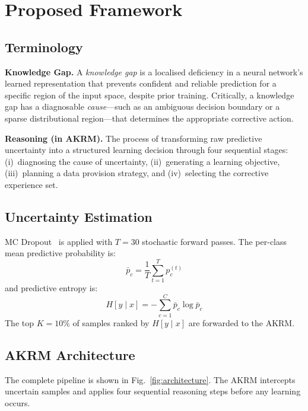 \documentclass[conference]{IEEEtran}
\begin{document}
\section{Proposed Framework}

\subsection{Terminology}

\textbf{Knowledge Gap.} A \emph{knowledge gap} is a localised deficiency in a neural network's learned representation that prevents confident and reliable prediction for a specific region of the input space, despite prior training. Critically, a knowledge gap has a diagnosable \emph{cause}---such as an ambiguous decision boundary or a sparse distributional region---that determines the appropriate corrective action.

\textbf{Reasoning (in AKRM).} The process of transforming raw predictive uncertainty into a structured learning decision through four sequential stages: (i)~diagnosing the cause of uncertainty, (ii)~generating a learning objective, (iii)~planning a data provision strategy, and (iv)~selecting the corrective experience set.

\subsection{Uncertainty Estimation}

MC Dropout~\cite{gal2016dropout} is applied with $T=30$ stochastic forward passes. The per-class mean predictive probability is:
\begin{equation}
\bar{p}_c = \frac{1}{T}\sum_{t=1}^{T} p_c^{(t)}
\end{equation}
and predictive entropy is:
\begin{equation}
H[y \mid x] = -\sum_{c=1}^{C} \bar{p}_c \log \bar{p}_c
\end{equation}
The top $K=10\%$ of samples ranked by $H[y \mid x]$ are forwarded to the AKRM.

\subsection{AKRM Architecture}

The complete pipeline is shown in Fig.~\ref{fig:architecture}. The AKRM intercepts uncertain samples and applies four sequential reasoning steps before any learning occurs.
\end{document}
